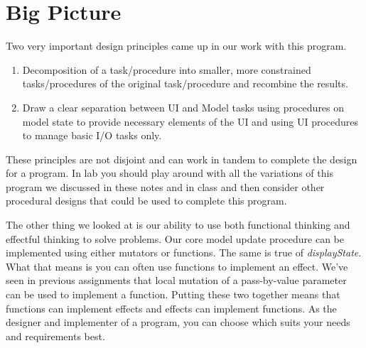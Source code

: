 \documentclass[nobib]{tufte-handout}
\begin{document}
\section{Big Picture}

Two very important design principles came up in our work with this program. 
\begin{enumerate}
\item Decomposition of a task/procedure into smaller, more constrained tasks/procedures of the original task/procedure and recombine the results.
\item Draw a clear separation between UI and Model tasks using procedures on model state to provide necessary elements of the UI and using UI procedures to manage basic I/O tasks only. 
\end{enumerate}
These principles are not disjoint and can work in tandem to complete the design for a program. In lab you should play around with all the variations of this program we discussed in these notes and in class and then consider other procedural designs that could be used to complete this program.

The other thing we looked at is our ability to use both functional thinking and effectful thinking to solve problems. Our core model update procedure can be implemented using either mutators or functions. The same is true of \textit{displayState}.  What that means is you can often use functions to implement an effect. We've seen in previous assignments that local mutation of a pass-by-value parameter can be used to implement a function. Putting these two together means that functions can implement effects and effects can implement functions. As the designer and implementer of a program, you can choose which suits your needs and requirements best. 
\end{document}
